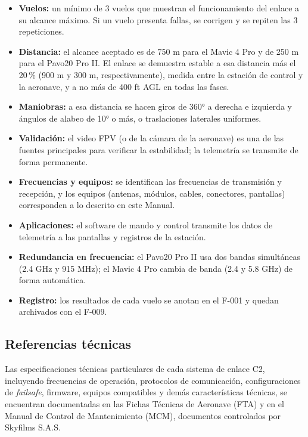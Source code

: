 \begin{itemize}
\item \textbf{Vuelos:} un mínimo de 3 vuelos que muestran el funcionamiento del enlace a su alcance máximo. Si un vuelo presenta fallas, se corrigen y se repiten las 3 repeticiones.
\item \textbf{Distancia:} el alcance aceptado es de 750 m para el Mavic 4 Pro y de 250 m para el Pavo20 Pro II. El enlace se demuestra estable a esa distancia más el 20\,\% (900 m y 300 m, respectivamente), medida entre la estación de control y la aeronave, y a no más de 400 ft AGL en todas las fases.
\item \textbf{Maniobras:} a esa distancia se hacen giros de 360° a derecha e izquierda y ángulos de alabeo de 10° o más, o traslaciones laterales uniformes.
\item \textbf{Validación:} el video FPV (o de la cámara de la aeronave) es una de las fuentes principales para verificar la estabilidad; la telemetría se transmite de forma permanente.
\item \textbf{Frecuencias y equipos:} se identifican las frecuencias de transmisión y recepción, y los equipos (antenas, módulos, cables, conectores, pantallas) corresponden a lo descrito en este Manual.
\item \textbf{Aplicaciones:} el software de mando y control transmite los datos de telemetría a las pantallas y registros de la estación.
\item \textbf{Redundancia en frecuencia:} el Pavo20 Pro II usa dos bandas simultáneas (2.4 GHz y 915 MHz); el Mavic 4 Pro cambia de banda (2.4 y 5.8 GHz) de forma automática.
\item \textbf{Registro:} los resultados de cada vuelo se anotan en el F-001 y quedan archivados con el F-009.
\end{itemize}

\subsection{Referencias técnicas}

Las especificaciones técnicas particulares de cada sistema de enlace C2, incluyendo frecuencias de operación, protocolos de comunicación, configuraciones de \textit{failsafe}, firmware, equipos compatibles y demás características técnicas, se encuentran documentadas en las Fichas Técnicas de Aeronave (FTA) y en el Manual de Control de Mantenimiento (MCM), documentos controlados por Skyfilms S.A.S.

